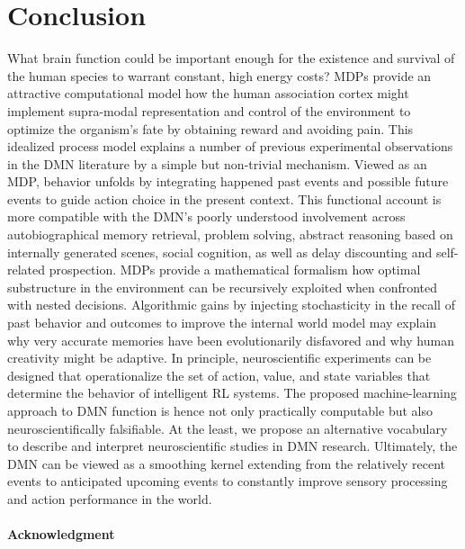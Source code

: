 \documentclass{article} %
\begin{document}
\section{Conclusion}
What brain function could be important enough
for the existence and survival of the human species
to warrant constant, high energy costs?
MDPs provide an attractive
computational model how the human association cortex
might implement supra-modal representation and control of the environment to
optimize the organism's fate by
obtaining reward and avoiding pain.
This idealized process model explains
a number of previous experimental observations in the
DMN literature by a simple but non-trivial mechanism.
%
Viewed as an MDP, behavior unfolds by integrating happened past events
and possible future events to guide action choice in the present context.
This functional account is more compatible with the DMN's
poorly understood involvement across
autobiographical memory retrieval, problem solving,
abstract reasoning based on internally generated scenes, social cognition,
as well as delay discounting and self-related prospection.
MDPs provide a mathematical formalism how
optimal substructure in the environment can be recursively exploited
when confronted with nested decisions.
Algorithmic gains by injecting stochasticity in the recall of past
behavior and outcomes to improve the internal world model may explain why
very accurate memories have been evolutionarily disfavored
and why human creativity might be adaptive.
%
In principle,
neuroscientific experiments can be designed that operationalize
the set of action, value, and state variables that determine
the behavior of intelligent RL systems.
The proposed machine-learning
approach to DMN function is hence not only practically computable but
also neuroscientifically falsifiable.
At the least, we propose an alternative vocabulary to
describe and interpret neuroscientific studies in DMN research.
%
Ultimately,
the DMN can be viewed as a smoothing kernel extending
from the relatively recent events to anticipated upcoming events
to constantly improve sensory processing and
action performance in the world.



\paragraph{Acknowledgment}


\small
% 
% 


\end{document}
